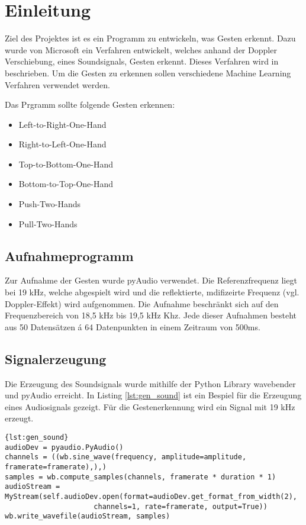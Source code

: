 \section{Einleitung}
Ziel des Projektes ist es ein Programm zu entwickeln, was Gesten erkennt. Dazu
wurde von Microsoft ein Verfahren entwickelt, welches anhand der Doppler
Verschiebung, eines Soundsignals, Gesten erkennt. Dieses Verfahren wird in
\cite{Gupta2012} beschrieben. Um die Gesten zu erkennen sollen verschiedene
Machine Learning Verfahren verwendet werden.

Das Prgramm sollte folgende Gesten erkennen:
\begin{itemize}
	\item Left-to-Right-One-Hand
	\item Right-to-Left-One-Hand
	\item Top-to-Bottom-One-Hand
	\item Bottom-to-Top-One-Hand
	\item Push-Two-Hands
	\item Pull-Two-Hands
\end{itemize}

\subsection{Aufnahmeprogramm}
\label{sec:gestures_dataformat}

Zur Aufnahme der Gesten wurde pyAudio verwendet. Die Referenzfrequenz liegt bei
19 kHz, welche abgespielt wird und die reflektierte, mdifizeirte Frequenz (vgl.
Doppler-Effekt) wird aufgenommen. Die Aufnahme beschränkt sich auf den
Frequenzbereich von 18,5 kHz bis 19,5 kHz Khz. Jede dieser Aufnahmen besteht aus
50 Datensätzen á 64 Datenpunkten in einem Zeitraum von 500ms. 

\subsection{Signalerzeugung}
Die Erzeugung des Soundsignals wurde mithilfe der Python Library wavebender und
pyAudio erreicht. In Listing \ref{lst:gen_sound} ist ein Bespiel für die
Erzeugung eines Audiosignals gezeigt. Für die Gestenerkennung wird ein Signal
mit 19 kHz erzeugt.

\enlargethispage{\baselineskip}
\enlargethispage{\baselineskip}
\enlargethispage{\baselineskip}
\begin{lstlisting}[caption={Erzeugung eines Soundsignals},label={lst:gen_sound}]{lst:gen_sound} 
audioDev = pyaudio.PyAudio()
channels = ((wb.sine_wave(frequency, amplitude=amplitude, framerate=framerate),),)
samples = wb.compute_samples(channels, framerate * duration * 1)
audioStream = MyStream(self.audioDev.open(format=audioDev.get_format_from_width(2),
					 channels=1, rate=framerate, output=True))
wb.write_wavefile(audioStream, samples)
\end{lstlisting}


\nocite{Gupta2012}